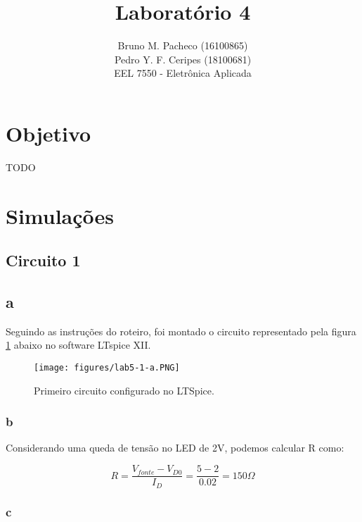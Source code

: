 \documentclass[a4paper]{report}
\begin{document}
 
\title{Laboratório 4}
\author{Bruno M. Pacheco (16100865)\\
Pedro Y. F. Ceripes (18100681) \\
EEL 7550 - Eletrônica Aplicada}
 
\maketitle
\section*{Objetivo}
 
TODO
 
\section*{Simulações}

\subsection*{Circuito 1}
\subsection*{a}

Seguindo as instruções do roteiro, foi montado o circuito representado pela figura \ref{fig:figures-lab5-1-a-png} abaixo no software LTspice XII.

\begin{figure}[H]
    \centering
    \texttt{[image: figures/lab5-1-a.PNG]}
    \caption{Primeiro circuito configurado no LTSpice.}
    \label{fig:figures-lab5-1-a-png}
\end{figure}

\subsubsection*{b}

Considerando uma queda de tensão no LED de 2V, podemos calcular R como:

\begin{equation*}
    R = \frac{V_{fonte}-V_{D0}}{I_D} = \frac{5-2}{0.02} = 150 \Omega
\end{equation*}

\subsubsection*{c}
\end{document}
